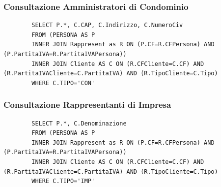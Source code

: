 \documentclass{elegantbook}
\begin{document}
\subsubsection{Consultazione Amministratori di Condominio}
	\begin{verbatim}
		SELECT P.*, C.CAP, C.Indirizzo, C.NumeroCiv
		FROM (PERSONA AS P 
		INNER JOIN Rappresent as R ON (P.CF=R.CFPersona) AND (P.PartitaIVA=R.PartitaIVAPersona))
		INNER JOIN Cliente AS C ON (R.CFCliente=C.CF) AND (R.PartitaIVACliente=C.PartitaIVA) AND (R.TipoCliente=C.Tipo)
		WHERE C.TIPO='CON'
	\end{verbatim}
\subsubsection{Consultazione Rappresentanti di Impresa}
	\begin{verbatim}
		SELECT P.*, C.Denominazione
		FROM (PERSONA AS P 
		INNER JOIN Rappresent as R ON (P.CF=R.CFPersona) AND (P.PartitaIVA=R.PartitaIVAPersona))
		INNER JOIN Cliente AS C ON (R.CFCliente=C.CF) AND (R.PartitaIVACliente=C.PartitaIVA) AND (R.TipoCliente=C.Tipo)
		WHERE C.TIPO='IMP'
	\end{verbatim}
	\begin{figure}[H]
		\centering
	\end{figure}
\end{document}

